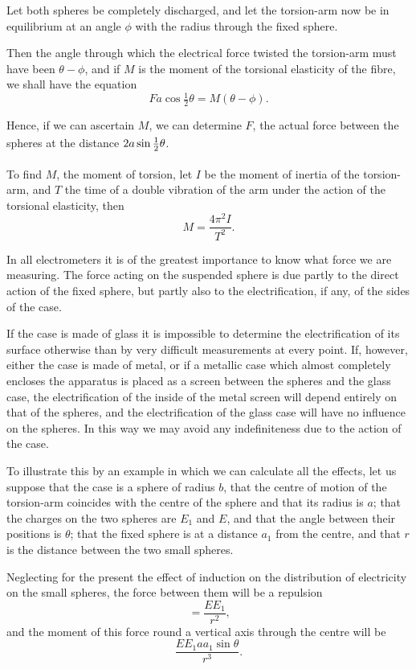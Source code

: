 \documentclass[12pt,oneside]{book}[2021/10/04]
\newcommand{\Runhead}[1]{\fancyhead[C]{\iffloatpage{}{\small#1}}}
\newcommand{\tstrut}{\rule[-1.5ex]{0pt}{4.2ex}}
\newcommand{\¬}{\hphantom{0}}
\begin{document}
Let both spheres be completely discharged, and let the torsion-arm
now be in equilibrium at an angle \(\phi\) with the radius through
the fixed sphere.

Then the angle through which the electrical force twisted the
torsion-arm must have been \(\theta - \phi\), and if \(M\) is the moment of
the torsional elasticity of the fibre, we shall have the equation
\[
Fa \cos \tfrac{1}{2} \theta = M ( \theta - \phi )\text{.}
\]

Hence, if we can ascertain \(M\), we can determine \(F\), the actual
force between the spheres at the distance \(2 a \sin \tstrut\frac{1}{2} \theta\).

To find \(M\), the moment of torsion, let \(I\) be the moment of inertia
of the torsion-arm, and \(T\) the time of a double vibration of the arm
under the action of the torsional elasticity, then
\[
M = \frac{4\pi^2I}{T^2}\text{.}
\]

In all electrometers it is of the greatest importance to know
what force we are measuring. The force acting on the suspended
sphere is due partly to the direct action of the fixed sphere, but
partly also to the electrification, if any, of the sides of the case.
\Runhead{INFLUENCE OF THE CASE.}

If the case is made of glass it is impossible to determine the
electrification of its surface otherwise than by very difficult measurements
at every point. If, however, either the case is made
of metal, or if a metallic case which almost completely encloses the
apparatus is placed as a screen between the spheres and the glass
case, the electrification of the inside of the metal screen will depend
entirely on that of the spheres, and the electrification of the glass
case will have no influence on the spheres. In this way we may
avoid any indefiniteness due to the action of the case.

To illustrate this by an example in which we can calculate all
the effects, let us suppose that the case is a sphere of radius \(b\),
that the centre of motion of the torsion-arm coincides with the
centre of the sphere and that its radius is \(a\); that the charges on
the two spheres are \(E_1\) and \(E\), and that the angle between their
positions is \(\theta\); that the fixed sphere is at a distance \(a_1\) from the
centre, and that \(r\) is the distance between the two small spheres.

Neglecting for the present the effect of induction on the distribution
of electricity on the small spheres, the force between
them will be a repulsion
\[
=\frac{EE_1}{r^2}\text{,}
\]
and the moment of this force round a vertical axis through the
centre will be
\[
\frac{EE_1aa_1 \sin \theta}{ r^3}\text{.}
\]
\end{document}
